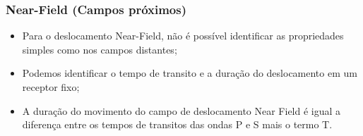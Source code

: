 \documentclass[10pt,a4paper]{beamer}
\begin{document}
\begin{frame}
\frametitle {Near-Field (Campos próximos)}
\begin{itemize}
\item Para o deslocamento Near-Field, não é possível identificar as propriedades simples como nos campos distantes; 
\item Podemos identificar o tempo de transito e a duração do deslocamento em um receptor fixo;
\item A duração do movimento do campo de deslocamento Near Field é igual a diferença entre os tempos de transitos das ondas P e S mais o termo T.
\end{itemize}
\end{frame}
\end{document}
